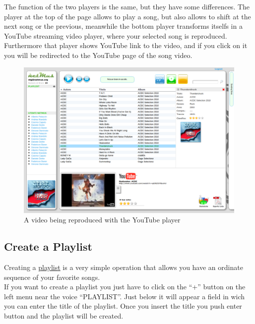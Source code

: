 The function of the two players is the same, but they have some differences.
The player at the top of the page allows to play a song, but also
allows to shift at the next song or the previous, meanwhile the bottom player
transforms itselfs in a YouTube streaming video player, where your selected song
is reproduced. Furthermore that player shows YouTube link to the video, and if
you click on it you will be redirected to the YouTube page of the song video.\\


\begin{figure}[htbp]
  \centering
  \includegraphics[width=15cm]{img/MU/player_youtube.png}
\caption{A video being reproduced with the YouTube player}
\end{figure} 

\subsection*{Create a Playlist}

Creating a \underline{playlist} is a very simple operation that allows you have
an ordinate sequence of your favorite songs.\\
If you want to create a playlist you just have to click on the ``+'' button on
the left menu near the voice ``PLAYLIST''. Just below it will appear a field in
wich you can enter the title of the playlist. Once you insert the title you push
enter button and the playlist will be created.\\

